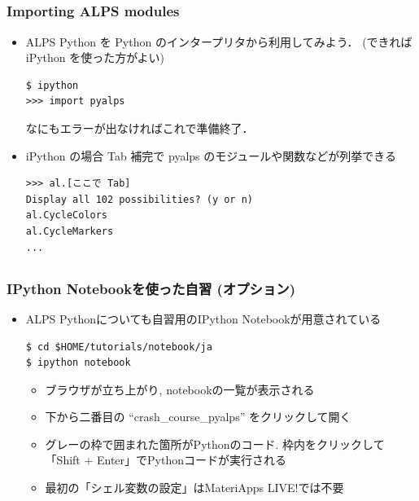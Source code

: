 \subsection*{\redm\whiteb\greenb}
\begin{frame}[t,fragile]
 \frametitle{Importing ALPS modules}

\begin{itemize}
 \item ALPS Python を Python のインタープリタから利用してみよう．
       (できれば iPython を使った方がよい)
       
\begin{lstlisting}
$ ipython
>>> import pyalps
\end{lstlisting}
       なにもエラーが出なければこれで準備終了．


 \item iPython の場合 Tab 補完で pyalps のモジュールや関数などが列挙できる

\begin{lstlisting}
>>> al.[ここで Tab]
Display all 102 possibilities? (y or n)
al.CycleColors   
al.CycleMarkers  
...            
\end{lstlisting}
\end{itemize}
\end{frame}

\subsection*{\redm\whiteb\greenb}
\begin{frame}[t, fragile]
\frametitle{IPython Notebookを使った自習 (オプション)}
\begin{itemize}
\item ALPS Pythonについても自習用のIPython Notebookが用意されている
\begin{lstlisting}
$ cd $HOME/tutorials/notebook/ja
$ ipython notebook
\end{lstlisting}	 
  \begin{itemize}
  \item ブラウザが立ち上がり, notebookの一覧が表示される
  \item 下から二番目の ``crash_course_pyalps'' をクリックして開く
  \item グレーの枠で囲まれた箇所がPythonのコード. 枠内をクリックして「Shift + Enter」でPythonコードが実行される
  \item 最初の「シェル変数の設定」はMateriApps LIVE!では不要
  \end{itemize}
\end{itemize}
\end{frame}

